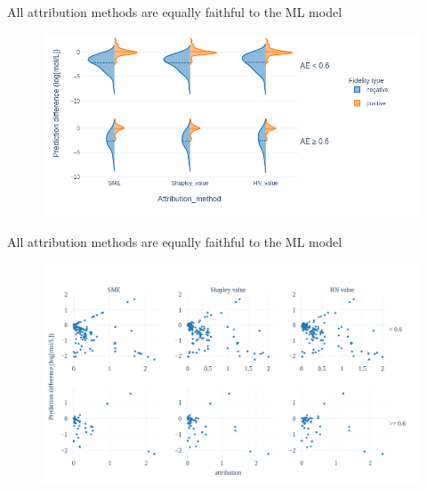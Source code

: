 \documentclass[aspectratio=169]{beamer}
\begin{document}
\begin{frame}{All attribution methods are equally faithful to the ML model}

    \begin{figure}[h]
        \centering
        \includegraphics[scale=0.5]{../thesis/Fig/fidelity_2.png}
    \end{figure}
   
\end{frame}


\begin{frame}{All attribution methods are equally faithful to the ML model}

    \begin{figure}[h]
        \centering
        \includegraphics[scale=0.28]{../thesis/Fig/absolute_fidelity_3}
    \end{figure}
   
\end{frame}
\end{document}
